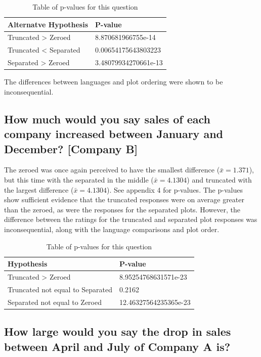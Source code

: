 \documentclass[
  11pt,
]{book}
\begin{document}
\begin{table}[!h]

\caption{\label{tab:unnamed-chunk-71}Table of p-values for this question}
\centering
\begin{tabular}[t]{l|l}
\hline
Alternatve Hypothesis & P-value\\
\hline
Truncated > Zeroed & 8.870681966755e-14\\
\hline
Truncated < Separated & 0.00654175643803223\\
\hline
Separated > Zeroed & 3.48079934270661e-13\\
\hline
\end{tabular}
\end{table}

The differences between languages and plot ordering were shown to be
inconsequential.

\subsection{How much would you say sales of each company increased between January and December? [Company B]}

The zeroed was once again perceived to have the smallest difference
(\(\bar{x} = 1.371\)), but this time with the separated in the middle
(\(\bar{x} = 4.1304\)) and truncated with the largest difference
(\(\bar{x} = 4.1304\)). See appendix 4 for p-values. The p-values show
sufficient evidence that the truncated responses were on average greater
than the zeroed, as were the responses for the separated plots. However,
the difference between the ratings for the truncated and separated plot
responses was inconsequential, along with the language comparisons and
plot order.

\begin{table}[!h]

\caption{\label{tab:unnamed-chunk-72}Table of p-values for this question}
\centering
\begin{tabular}[t]{l|l}
\hline
Hypothesis & P-value\\
\hline
Truncated > Zeroed & 8.95254768631571e-23\\
\hline
Truncated not equal to Separated & 0.2162\\
\hline
Separated not equal to Zeroed & 12.46327564235365e-23\\
\hline
\end{tabular}
\end{table}

\subsection{How large would you say the drop in sales between April and July of Company A  is?}
\end{document}
